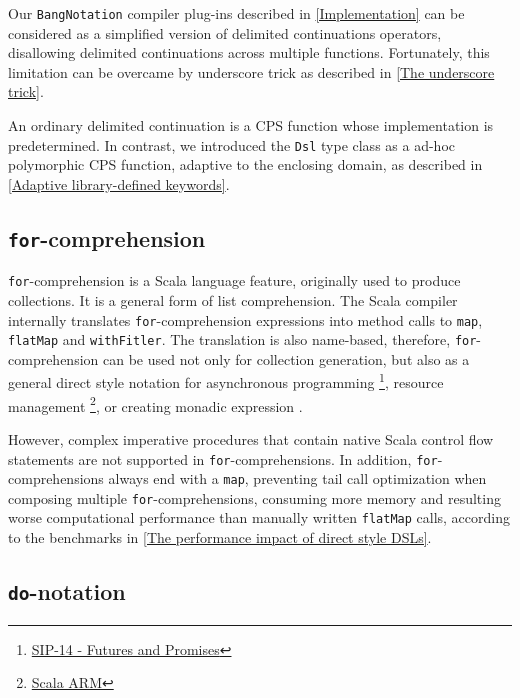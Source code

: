 Our \lstinline{BangNotation} compiler plug-ins described in \cref{Implementation} can be considered as a simplified version of delimited continuations operators, disallowing delimited continuations across multiple functions. Fortunately, this limitation can be overcame by underscore trick as described in \cref{The underscore trick}.

An ordinary delimited continuation is a CPS function whose implementation is predetermined. In contrast, we introduced the \lstinline{Dsl} type class as a ad-hoc polymorphic CPS function, adaptive to the enclosing domain, as described in \cref{Adaptive library-defined keywords}.

\subsection{\lstinline{for}-comprehension}\label{for-comprehension}

\lstinline{for}-comprehension is a Scala language feature, originally used to produce collections. It is a general form of list comprehension. The Scala compiler internally translates \lstinline{for}-comprehension expressions into method calls to \lstinline{map}, \lstinline{flatMap} and \lstinline{withFitler}. The translation is also name-based, therefore, \lstinline{for}-comprehension can be used not only for collection generation, but also as a general direct style notation for asynchronous programming \footnote{\href{https://docs.scala-lang.org/sips/futures-promises.html}{SIP-14 - Futures and Promises}}, resource management \footnote{\href{http://jsuereth.com/scala-arm/}{Scala ARM}}, or creating monadic expression \cite{kenji2017scalaz,typelevel2017cats,twitter2016algebird}.

However, complex imperative procedures that contain native Scala control flow statements are not supported in \lstinline{for}-comprehensions. In addition, \lstinline{for}-comprehensions always end with a \lstinline{map}, preventing tail call optimization when composing multiple \lstinline{for}-comprehensions, consuming more memory and resulting worse computational performance than manually written \lstinline{flatMap} calls, according to the benchmarks in \cref{The performance impact of direct style DSLs}.

\subsection{\lstinline{do}-notation}\label{do-notation}

